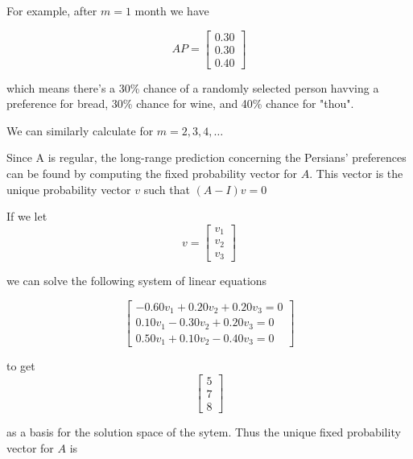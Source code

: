 \documentclass{amsart}
\theoremstyle{definition}
\theoremstyle{remark}
\numberwithin{equation}{section}
\begin{document}
For example, after $m = 1$ month we have 

\begin{equation}
    AP = \begin{bmatrix}
           0.30 \\
           0.30 \\
           0.40
         \end{bmatrix}
\end{equation}

which means there's a 30\% chance of a randomly selected person havving a preference for bread, 30\% chance for wine, and 40\% chance for "thou".

We can similarly calculate for $m = 2, 3, 4, \ldots $

Since A is regular, the long-range prediction concerning the Persians' preferences can be found by computing the fixed probability vector for $A$. 
This vector is the unique probability vector $v$ such that $(A - I)v = 0$

If we let 
\begin{equation}
    v = \begin{bmatrix}
           v_1 \\
           v_2 \\
           v_3


         \end{bmatrix}
\end{equation}

we can solve the following system of linear equations

\begin{equation}
    \begin{bmatrix}
           -0.60v_1 + 0.20v_2 + 0.20v_3  = 0 \\
           0.10v_1 - 0.30v_2 + 0.20v_3 = 0\\
           0.50v_1 + 0.10v_2 - 0.40v_3 = 0
         \end{bmatrix}
\end{equation}

 to get 
\begin{equation}
    \begin{bmatrix}
           5 \\
           7 \\
           8


         \end{bmatrix}
\end{equation}

as a basis for the solution space of the sytem.
Thus the unique fixed probability vector for $A$ is 
\end{document}

